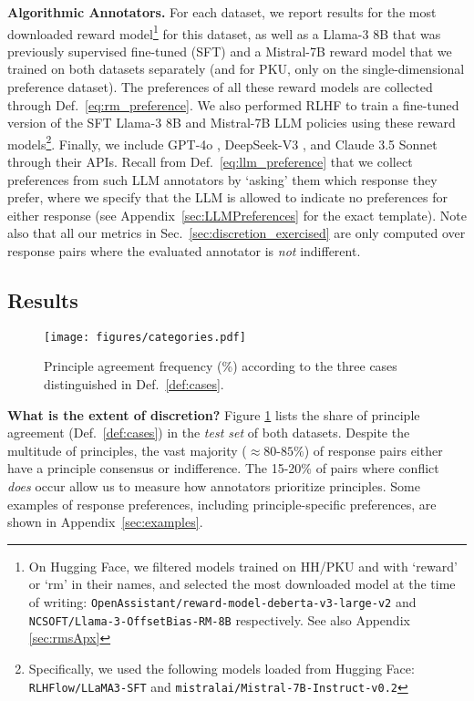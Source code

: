\documentclass{article}
\begin{document}
\noindent\textbf{Algorithmic Annotators.} For each dataset, we report results for the most downloaded reward model\footnote{On Hugging Face, we filtered models trained on HH/PKU and with `reward' or `rm' in their names, and selected the most downloaded model at the time of writing: \texttt{OpenAssistant/reward-model-deberta-v3-large-v2} and \texttt{NCSOFT/Llama-3-OffsetBias-RM-8B} respectively. See also Appendix \ref{sec:rmsApx}} for this dataset, as well as a Llama-3 8B 
 that was previously supervised fine-tuned (SFT) \cite{dong2024rlhf} and a Mistral-7B reward model that we trained on both datasets separately (and for PKU, only on the single-dimensional preference dataset). The preferences of all these reward models are collected through Def.~\ref{eq:rm_preference}. 
We also performed RLHF to train a fine-tuned version of the SFT Llama-3 8B \cite{dong2024rlhf} and Mistral-7B \cite{mistral7b} LLM policies using these reward models\footnote{Specifically, we used the following models loaded from Hugging Face: \texttt{RLHFlow/LLaMA3-SFT} and \texttt{mistralai/Mistral-7B-Instruct-v0.2}}.
Finally, we include GPT-4o \cite{GPT4o}, DeepSeek-V3 \cite{deepseekai2024deepseekv3technicalreport}, and Claude 3.5 Sonnet \cite{claude35haiku2024} through their APIs. 
Recall from Def.~\ref{eq:llm_preference} that we collect preferences from such LLM annotators by `asking' them which response they prefer, where we specify that the LLM is allowed to indicate no preferences for either response (see Appendix~\ref{sec:LLMPreferences} for the exact template). Note also that all our metrics in Sec.~\ref{sec:discretion_exercised} are only computed over response pairs where the evaluated annotator is \textit{not} indifferent. 

\subsection{Results}\label{sec:results}
\begin{figure}[tb]
    \centering
    \texttt{[image: figures/categories.pdf]}
    \caption{Principle agreement frequency (\%) according to the three cases distinguished in Def.~\ref{def:cases}.}
    \label{fig:principle_agreements}
\end{figure}

\textbf{What is the extent of discretion?}
Figure \ref{fig:principle_agreements} lists the share of principle agreement (Def.~\ref{def:cases}) in the \textit{test set} of both datasets. Despite the multitude of principles, the vast majority ($\approx 80$-$85\%$) of response pairs either have a principle consensus or indifference. The 15-20\% of pairs where conflict \textit{does} occur allow us to measure how annotators  prioritize principles. Some examples of response preferences, including principle-specific preferences, are shown in Appendix~\ref{sec:examples}.
\end{document}
